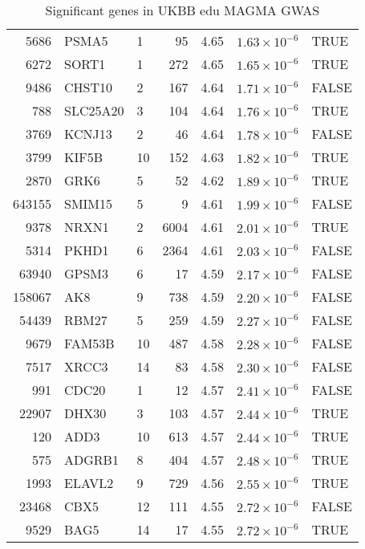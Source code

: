 \begin{table}[ht]
\begin{adjustbox}{totalheight=10in}
\begin{tabular}{rllrrrl}
  5686 & PSMA5 & 1 &  95 & 4.65 & $1.63 \times 10^{-6}$ & TRUE \\ 
  6272 & SORT1 & 1 & 272 & 4.65 & $1.65 \times 10^{-6}$ & TRUE \\ 
  9486 & CHST10 & 2 & 167 & 4.64 & $1.71 \times 10^{-6}$ & FALSE \\ 
  788 & SLC25A20 & 3 & 104 & 4.64 & $1.76 \times 10^{-6}$ & TRUE \\ 
  3769 & KCNJ13 & 2 &  46 & 4.64 & $1.78 \times 10^{-6}$ & FALSE \\ 
  3799 & KIF5B & 10 & 152 & 4.63 & $1.82 \times 10^{-6}$ & TRUE \\ 
  2870 & GRK6 & 5 &  52 & 4.62 & $1.89 \times 10^{-6}$ & TRUE \\ 
  643155 & SMIM15 & 5 &   9 & 4.61 & $1.99 \times 10^{-6}$ & FALSE \\ 
  9378 & NRXN1 & 2 & 6004 & 4.61 & $2.01 \times 10^{-6}$ & TRUE \\ 
  5314 & PKHD1 & 6 & 2364 & 4.61 & $2.03 \times 10^{-6}$ & FALSE \\ 
  63940 & GPSM3 & 6 &  17 & 4.59 & $2.17 \times 10^{-6}$ & FALSE \\ 
  158067 & AK8 & 9 & 738 & 4.59 & $2.20 \times 10^{-6}$ & FALSE \\ 
  54439 & RBM27 & 5 & 259 & 4.59 & $2.27 \times 10^{-6}$ & FALSE \\ 
  9679 & FAM53B & 10 & 487 & 4.58 & $2.28 \times 10^{-6}$ & FALSE \\ 
  7517 & XRCC3 & 14 &  83 & 4.58 & $2.30 \times 10^{-6}$ & FALSE \\ 
  991 & CDC20 & 1 &  12 & 4.57 & $2.41 \times 10^{-6}$ & FALSE \\ 
  22907 & DHX30 & 3 & 103 & 4.57 & $2.44 \times 10^{-6}$ & TRUE \\ 
  120 & ADD3 & 10 & 613 & 4.57 & $2.44 \times 10^{-6}$ & TRUE \\ 
  575 & ADGRB1 & 8 & 404 & 4.57 & $2.48 \times 10^{-6}$ & TRUE \\ 
  1993 & ELAVL2 & 9 & 729 & 4.56 & $2.55 \times 10^{-6}$ & TRUE \\ 
  23468 & CBX5 & 12 & 111 & 4.55 & $2.72 \times 10^{-6}$ & FALSE \\ 
  9529 & BAG5 & 14 &  17 & 4.55 & $2.72 \times 10^{-6}$ & TRUE \\ 
   \hline
\end{tabular}
\end{adjustbox}
\caption{Significant genes in UKBB edu MAGMA GWAS} 
\label{tab:Significant genes in UKBB edu MAGMA GWAS}
\end{table}


